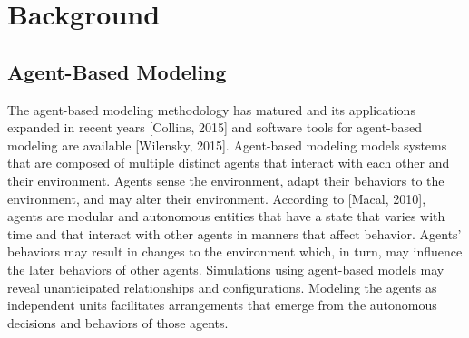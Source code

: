 \section{Background}\label{sec:Background}
\lipsum[3]


\subsection{Agent-Based Modeling}\label{subsec:abm}
    The agent-based modeling methodology has matured and its applications expanded
    in recent years [Collins, 2015] and software tools for agent-based modeling
    are available [Wilensky, 2015].
    Agent-based modeling models systems that are composed of multiple distinct agents
    that interact with each other and their environment.
    Agents sense the environment, adapt their behaviors to the environment,
    and may alter their environment.
    According to [Macal, 2010], agents are modular and autonomous entities that have a
    state that varies with time and that interact with other agents in manners that
    affect behavior.
    Agents' behaviors may result in changes to the environment which, in turn, may
    influence the later behaviors of other agents.
    Simulations using agent-based models may reveal unanticipated relationships
    and configurations.
    Modeling the agents as independent units facilitates arrangements that emerge
    from the autonomous decisions and behaviors of those agents.

